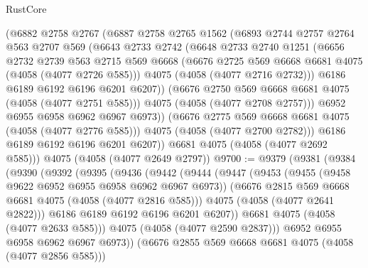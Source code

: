 \begin{lexlean}{RustCore}
\begin{coremodule}
            (@6882
              @2758
              @2767
              (@6887
                @2758
                @2765
                @1562
                (@6893
                  @2744
                  @2757
                  @2764
                  @563
                  @2707
                  @569
                  (@6643
                    @2733
                    @2742
                    (@6648
                      @2733
                      @2740
                      @1251
                      (@6656
                        @2732
                        @2739
                        @563
                        @2715
                        @569
                        @6668
                        (@6676 @2725 @569 @6668 @6681 @4075 (@4058 (@4077 @2726 @585)))
                        @4075
                        (@4058 (@4077 @2716 @2732)))
                      @6186
                      @6189
                      @6192
                      @6196
                      @6201
                      @6207))
                  (@6676 @2750 @569 @6668 @6681 @4075 (@4058 (@4077 @2751 @585)))
                  @4075
                  (@4058 (@4077 @2708 @2757)))
                @6952
                @6955
                @6958
                @6962
                @6967
                @6973))
            (@6676 @2775 @569 @6668 @6681 @4075 (@4058 (@4077 @2776 @585)))
            @4075
            (@4058 (@4077 @2700 @2782)))
          @6186
          @6189
          @6192
          @6196
          @6201
          @6207))
      @6681
      @4075
      (@4058 (@4077 @2692 @585)))
    @4075
    (@4058 (@4077 @2649 @2797))
@9700 := @9379
    (@9381
      (@9384
        (@9390
          (@9392
            (@9395
              (@9436
                (@9442
                  (@9444
                    (@9447
                      (@9453
                        (@9455 (@9458 @9622 @6952 @6955 @6958 @6962 @6967 @6973))
                        (@6676 @2815 @569 @6668 @6681 @4075 (@4058 (@4077 @2816 @585)))
                        @4075
                        (@4058 (@4077 @2641 @2822)))
                      @6186
                      @6189
                      @6192
                      @6196
                      @6201
                      @6207))
                  @6681
                  @4075
                  (@4058 (@4077 @2633 @585)))
                @4075
                (@4058 (@4077 @2590 @2837)))
              @6952
              @6955
              @6958
              @6962
              @6967
              @6973))
          (@6676 @2855 @569 @6668 @6681 @4075 (@4058 (@4077 @2856 @585)))

\end{coremodule}
\end{lexlean}
